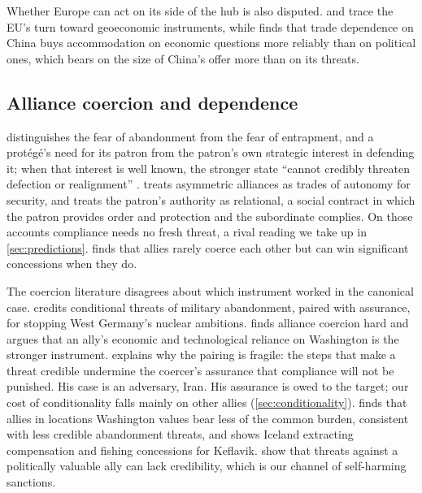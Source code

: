 Whether Europe can act on its side of the hub is also disputed. \citet{meunier2019geopoliticization} and \citet{bauerledanzman2024eu} trace the EU's turn toward geoeconomic instruments, while \citet{kastner2016buying} finds that trade dependence on China buys accommodation on economic questions more reliably than on political ones, which bears on the size of China's offer more than on its threats.

\subsection{Alliance coercion and dependence}

\citet{snyder1984security, snyder1997alliance} distinguishes the fear of abandonment from the fear of entrapment, and a protégé's need for its patron from the patron's own strategic interest in defending it; when that interest is well known, the stronger state ``cannot credibly threaten defection or realignment'' \citep[472--473]{snyder1984security}. \citet{morrow1991alliances} treats asymmetric alliances as trades of autonomy for security, and \citet{lake2009hierarchy} treats the patron's authority as relational, a social contract in which the patron provides order and protection and the subordinate complies. On those accounts compliance needs no fresh threat, a rival reading we take up in \cref{sec:predictions}. \citet{drezner1999sanctions} finds that allies rarely coerce each other but can win significant concessions when they do.

The coercion literature disagrees about which instrument worked in the canonical case. \citet{gerzhoy2015alliance} credits conditional threats of military abandonment, paired with assurance, for stopping West Germany's nuclear ambitions. \citet{lanoszka2018atomic} finds alliance coercion hard and argues that an ally's economic and technological reliance on Washington is the stronger instrument. \citet{pauly2024damned} explains why the pairing is fragile: the steps that make a threat credible undermine the coercer's assurance that compliance will not be punished. His case is an adversary, Iran. His assurance is owed to the target; our cost of conditionality falls mainly on other allies (\cref{sec:conditionality}). \citet{blankenship2021price} finds that allies in locations Washington values bear less of the common burden, consistent with less credible abandonment threats, and \citet[111--119]{blankenship2023burden} shows Iceland extracting compensation and fishing concessions for Keflavik. \citet{wolford2017alliances} show that threats against a politically valuable ally can lack credibility, which is our channel of self-harming sanctions.

